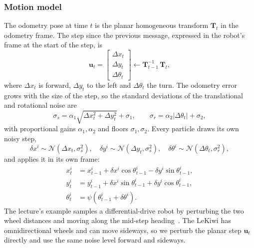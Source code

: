 \documentclass[conference]{IEEEtran}
\newcommand{\vect}[1]{\boldsymbol{#1}}
\begin{document}
\subsubsection{Motion model}
The odometry pose at time $t$ is the planar homogeneous transform $\vect{T}_t$ in the odometry frame. The step since the previous message, expressed in the robot's frame at the start of the step, is
\begin{equation}
\vect{u}_t = \begin{bmatrix} \Delta x_t \\ \Delta y_t \\ \Delta\theta_t \end{bmatrix} \leftarrow \vect{T}_{t-1}^{-1}\, \vect{T}_t,
\label{eq:control}
\end{equation}
where $\Delta x_t$ is forward, $\Delta y_t$ to the left and $\Delta\theta_t$ the turn. The odometry error grows with the size of the step, so the standard deviations of the translational and rotational noise are
\begin{equation}
\sigma_{s} = \alpha_1 \sqrt{\Delta x_t^2 + \Delta y_t^2} + \sigma_{1}, \qquad
\sigma_{r} = \alpha_2 \left|\Delta\theta_t\right| + \sigma_{2},
\label{eq:noise}
\end{equation}
with proportional gains $\alpha_1, \alpha_2$ and floors $\sigma_1, \sigma_2$. Every particle draws its own noisy step,
\begin{equation}
\delta x^i \sim \mathcal{N}(\Delta x_t, \sigma_s^2), \quad
\delta y^i \sim \mathcal{N}(\Delta y_t, \sigma_s^2), \quad
\delta\theta^i \sim \mathcal{N}(\Delta\theta_t, \sigma_r^2),
\label{eq:sample}
\end{equation}
and applies it in its own frame:
\begin{equation}
\begin{aligned}
x_t^i &= x_{t-1}^i + \delta x^i \cos\theta_{t-1}^i - \delta y^i \sin\theta_{t-1}^i,\\
y_t^i &= y_{t-1}^i + \delta x^i \sin\theta_{t-1}^i + \delta y^i \cos\theta_{t-1}^i,\\
\theta_t^i &= \psi\!\left(\theta_{t-1}^i + \delta\theta^i\right).
\end{aligned}
\label{eq:propagate}
\end{equation}
The lecture's example samples a differential-drive robot by perturbing the two wheel distances and moving along the mid-step heading~\cite{clark7b}. The LeKiwi has omnidirectional wheels and can move sideways, so we perturb the planar step $\vect{u}_t$ directly and use the same noise level forward and sideways.
\end{document}
